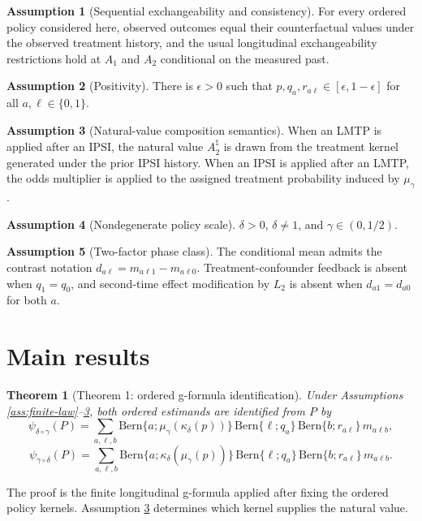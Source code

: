\documentclass[11pt]{article}
\theoremstyle{definition}
\newtheorem{assumption}{Assumption}
\theoremstyle{plain}
\newtheorem{theorem}{Theorem}
\theoremstyle{remark}
\begin{document}
\begin{assumption}[Sequential exchangeability and consistency]\label{ass:seq-exch}
For every ordered policy considered here, observed outcomes equal their counterfactual values under the observed treatment history, and the usual longitudinal exchangeability restrictions hold at \(A_1\) and \(A_2\) conditional on the measured past.
\end{assumption}

\begin{assumption}[Positivity]\label{ass:positivity}
There is \(\epsilon>0\) such that \(p,q_a,r_{a\ell}\in[\epsilon,1-\epsilon]\) for all \(a,\ell\in\{0,1\}\).
\end{assumption}

\begin{assumption}[Natural-value composition semantics]\label{ass:natural-semantics}
When an LMTP is applied after an IPSI, the natural value \(A_2^{\natural}\) is drawn from the treatment kernel generated under the prior IPSI history. When an IPSI is applied after an LMTP, the odds multiplier is applied to the assigned treatment probability induced by \(\mu_\gamma\).
\end{assumption}

\begin{assumption}[Nondegenerate policy scale]\label{ass:policy-scale}
\(\delta>0\), \(\delta\ne1\), and \(\gamma\in(0,1/2)\).
\end{assumption}

\begin{assumption}[Two-factor phase class]\label{ass:phase-class}
The conditional mean admits the contrast notation \(d_{a\ell}=m_{a\ell 1}-m_{a\ell 0}\). Treatment-confounder feedback is absent when \(q_1=q_0\), and second-time effect modification by \(L_2\) is absent when \(d_{a1}=d_{a0}\) for both \(a\).
\end{assumption}

\section{Main results}
\begin{theorem}[Theorem 1: ordered g-formula identification]\label{thm:ordered-id}
Under Assumptions \ref{ass:finite-law}--\ref{ass:natural-semantics}, both ordered estimands are identified from \(P\) by
\[
\psi_{\delta\circ\gamma}(P)=
\sum_{a,\ell,b} \mathrm{Bern}\{a;\mu_\gamma(\kappa_\delta(p))\}\,
\mathrm{Bern}\{\ell;q_a\}\,\mathrm{Bern}\{b;r_{a\ell}\}\,m_{a\ell b},
\]
\[
\psi_{\gamma\circ\delta}(P)=
\sum_{a,\ell,b} \mathrm{Bern}\{a;\kappa_\delta(\mu_\gamma(p))\}\,
\mathrm{Bern}\{\ell;q_a\}\,\mathrm{Bern}\{b;r_{a\ell}\}\,m_{a\ell b}.
\]
\end{theorem}
The proof is the finite longitudinal g-formula applied after fixing the ordered policy kernels. Assumption \ref{ass:natural-semantics} determines which kernel supplies the natural value.
\end{document}
